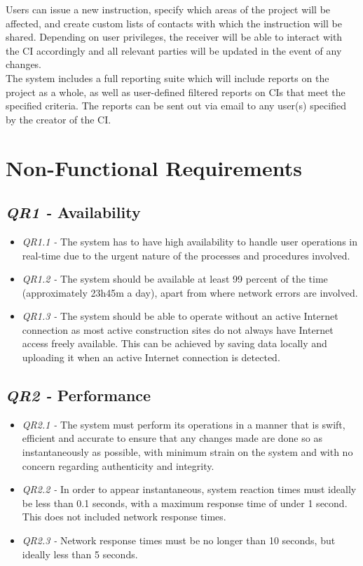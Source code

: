 \documentclass[11pt]{article}
\begin{document}
\begin{flushleft}
Users can issue a new instruction, specify which areas of the project will be affected, and create custom lists of contacts with which the instruction will be shared. Depending on user privileges, the receiver will be able to interact with the CI accordingly and all relevant parties will be updated in the event of any changes.\\[0.5cm]

The system includes a full reporting suite which will include reports on the project as a whole, as well as user-defined filtered reports on CIs that meet the specified criteria. The reports can be sent out via email to any user(s) specified by the creator of the CI.\\[0.5cm]
\end{flushleft}

\newpage

\section{Non-Functional Requirements}
\subsection{\textit{QR1 -} Availability} \label{availability}
\begin{itemize}
    \item \textit{QR1.1 -} The system has to have high availability to handle user operations in real-time due to the urgent nature of the processes and procedures involved.
    \item \textit{QR1.2 -} The system should be available at least 99 percent of the time (approximately 23h45m a day), apart from where network errors are involved.
    \item \textit{QR1.3 -} The system should be able to operate without an active Internet connection as most active construction sites do not always have Internet access freely available. This can be achieved by saving data locally and uploading it when an active Internet connection is detected.
\end{itemize}

\subsection{\textit{QR2 -} Performance}
\begin{itemize}
    \item \textit{QR2.1 -} The system must perform its operations in a manner that is swift, efficient and accurate to ensure that any changes made are done so as instantaneously as possible, with minimum strain on the system and with no concern regarding authenticity and integrity.
    \item \textit{QR2.2 -} In order to appear instantaneous, system reaction times must ideally be less than 0.1 seconds, with a maximum response time of under 1 second. This does not included network response times.
    \item \textit{QR2.3 -} Network response times must be no longer than 10 seconds, but ideally less than 5 seconds.
\end{itemize}
\end{document}
